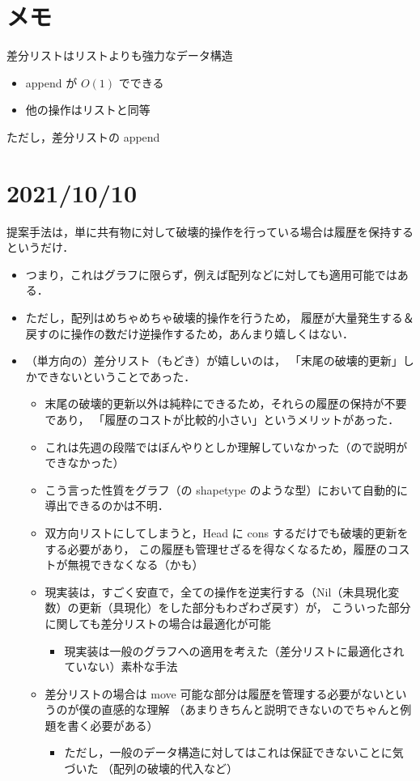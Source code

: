 \documentclass[10pt, a4j, twocolumn]{scrartcl}
\begin{document}
\section{メモ}
\label{sec:org8017134}

差分リストはリストよりも強力なデータ構造
\begin{itemize}
\item append が \(O(1)\) でできる
\item 他の操作はリストと同等
\end{itemize}


ただし，差分リストの append


\section{2021/10/10}
\label{sec:org63b770d}

提案手法は，単に共有物に対して破壊的操作を行っている場合は履歴を保持するというだけ．
\begin{itemize}
\item つまり，これはグラフに限らず，例えば配列などに対しても適用可能ではある．
\item ただし，配列はめちゃめちゃ破壊的操作を行うため，
履歴が大量発生する＆戻すのに操作の数だけ逆操作するため，あんまり嬉しくはない．
\item （単方向の）差分リスト（もどき）が嬉しいのは，
「末尾の破壊的更新」しかできないということであった．
\begin{itemize}
\item 末尾の破壊的更新以外は純粋にできるため，それらの履歴の保持が不要であり，
「履歴のコストが比較的小さい」というメリットがあった．
\item これは先週の段階ではぼんやりとしか理解していなかった（ので説明ができなかった）
\item こう言った性質をグラフ（の shapetype のような型）において自動的に導出できるのかは不明．
\item 双方向リストにしてしまうと，Head に cons するだけでも破壊的更新をする必要があり，
この履歴も管理せざるを得なくなるため，履歴のコストが無視できなくなる（かも）
\item 現実装は，すごく安直で，全ての操作を逆実行する（Nil（未具現化変数）の更新（具現化）をした部分もわざわざ戻す）が，
こういった部分に関しても差分リストの場合は最適化が可能
\begin{itemize}
\item 現実装は一般のグラフへの適用を考えた（差分リストに最適化されていない）素朴な手法
\end{itemize}
\item 差分リストの場合は move 可能な部分は履歴を管理する必要がないというのが僕の直感的な理解
（あまりきちんと説明できないのでちゃんと例題を書く必要がある）
\begin{itemize}
\item ただし，一般のデータ構造に対してはこれは保証できないことに気づいた
（配列の破壊的代入など）
\end{itemize}
\end{itemize}
\end{itemize}
\end{document}
